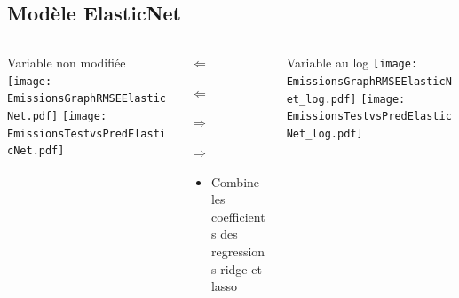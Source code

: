 \documentclass[8pt,aspectratio=169,hyperref={unicode=true}]{beamer}
\begin{document}
\subsection{Modèle ElasticNet}
\begin{frame}{\insertsubsection}
  \begin{columns}[t]
    \begin{column}{.33\textwidth}
      \centering Variable non modifiée
      \texttt{[image: EmissionsGraphRMSEElasticNet.pdf]}
      \texttt{[image: EmissionsTestvsPredElasticNet.pdf]}
    \end{column}
    \begin{column}{.33\textwidth}
      $\Longleftarrow$
      \scriptsize
      {\centering
        }
      

      \normalsize
      $\Longleftarrow$

      \raggedleft $\Longrightarrow$
      \scriptsize
      {\centering
        }
      

      \normalsize
      $\Longrightarrow$

      \raggedright
      \begin{itemize}
        \item Combine les coefficients des regressions ridge et lasso
      \end{itemize}
    \end{column}
    \begin{column}{.33\textwidth}
      \centering Variable au log
      \texttt{[image: EmissionsGraphRMSEElasticNet\_log.pdf]}
      \texttt{[image: EmissionsTestvsPredElasticNet\_log.pdf]}
    \end{column}
  \end{columns}
\end{frame}
\end{document}
